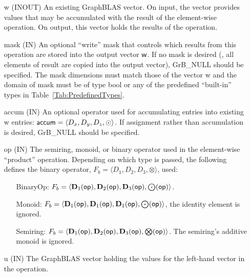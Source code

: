 \begin{itemize}[leftmargin=1.1in]
    \item[{\sf w}]    ({\sf INOUT}) An existing GraphBLAS vector.  On input,
    the vector provides values that may be accumulated with the result of the
    element-wise operation.  On output, this vector holds the results of the
    operation.

    \item[{\sf mask}]  ({\sf IN}) An optional ``write'' mask that controls which
    results from this operation are stored into the output vector
    ${\sf w}$.  If no mask is desired (\ie, all elements
    of result are copied into the output vector), {\sf GrB\_NULL}
    should be specified. The mask dimensions must match those of the
    vector {\sf w} and the domain of {\sf mask} must be
    of type {\sf bool} or any of the predefined ``built-in'' types in
    Table~\ref{Tab:PredefinedTypes}.

    \item[{\sf accum}] ({\sf IN}) An optional operator used for accumulating
    entries into existing {\sf w} entries: ${\sf accum} = \langle D_x,
    D_y, D_z,\odot \rangle$. If assignment rather than accumulation is
    desired, {\sf GrB\_NULL} should be specified.

    \item[{\sf op}]    ({\sf IN}) The semiring, monoid, or binary operator 
    used in the element-wise ``product'' operation.  Depending on which type is
    passed, the following defines the binary operator, $F_b=\langle D_1,D_2,D_3,\otimes\rangle$, used:
    \begin{itemize}[leftmargin=1.1in]
    \item[BinaryOp:] $F_b = \langle \bold{D}_1({\sf op}), \bold{D}_2({\sf op}),
    \bold{D}_3({\sf op}),\bold{\bigodot}({\sf op})\rangle$.  
    \item[Monoid:] $F_b = \langle \bold{D}_1({\sf op}), \bold{D}_1({\sf op}),
    \bold{D}_1({\sf op}),\bold{\bigodot}({\sf op})\rangle$,
    the identity element is ignored. 
    \item[Semiring:] $F_b = \langle \bold{D}_1({\sf op}), \bold{D}_2({\sf op}),
    \bold{D}_3({\sf op}),\bold{\bigotimes}({\sf op})\rangle$.  The semiring's
    additive monoid is ignored.
    \end{itemize}
    
    \item[{\sf u}]     ({\sf IN}) The GraphBLAS vector holding the values for
    the left-hand vector in the operation.
    

\end{itemize}
